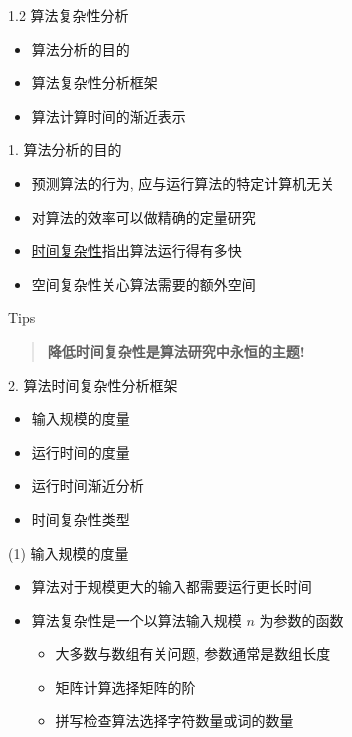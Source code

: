\documentclass[fontset=fandol,UTF8,12pt,aspectratio=169,fleqn]{beamer}
\begin{document}
\begin{frame}{1.2 算法复杂性分析}
\begin{itemize}[<+-|alert@+>]
\item[1.] 算法分析的目的
\item[2.] 算法复杂性分析框架
\item[3.] 算法计算时间的渐近表示
\end{itemize}
\end{frame}

\begin{frame}{1.  算法分析的目的}
\begin{itemize}[<+-|alert@+>]
\item 预测算法的行为, 应与运行算法的特定计算机无关  
\item 对算法的效率可以做精确的定量研究 
\item \underline{时间复杂性}指出算法运行得有多快 
\item 空间复杂性关心算法需要的额外空间 
\end{itemize}
\end{frame}

\begin{frame}{Tips}
\begin{quote}
  \huge{\textbf{降低时间复杂性是算法研究中永恒的主题!}}
\end{quote}
\end{frame}


\begin{frame}{2. 算法时间复杂性分析框架}
\begin{itemize}[<+-|alert@+>]
\item[(1)] 输入规模的度量
\item[(2)] 运行时间的度量
\item[(3)] 运行时间渐近分析 
\item[(4)] 时间复杂性类型
\end{itemize}
\end{frame}

\begin{frame}{(1) 输入规模的度量}
\begin{itemize}[<+-|alert@+>]
\item 算法对于规模更大的输入都需要运行更长时间  
\item 算法复杂性是一个以算法输入规模 $n$ 为参数的函数 
  \begin{itemize}[<+-|alert@+>]
\item 大多数与数组有关问题, 参数通常是数组长度 
\item 矩阵计算选择矩阵的阶 
\item 拼写检查算法选择字符数量或词的数量 
\end{itemize}
\end{itemize}
\end{frame}
\end{document}
